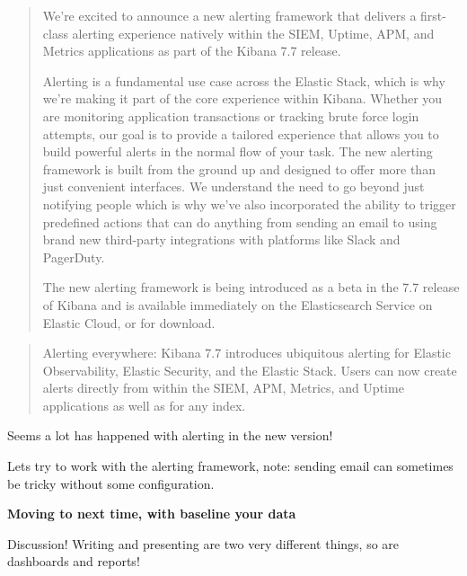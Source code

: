 \documentclass[Screen16to9,17pt]{foils}
\begin{document}
\begin{quote}\small
We’re excited to announce a new alerting framework that delivers a first-class alerting experience natively within the SIEM, Uptime, APM, and Metrics applications as part of the Kibana 7.7 release.

Alerting is a fundamental use case across the Elastic Stack, which is why we’re making it part of the core experience within Kibana. Whether you are monitoring application transactions or tracking brute force login attempts, our goal is to provide a tailored experience that allows you to build powerful alerts in the normal flow of your task. The new alerting framework is built from the ground up and designed to offer more than just convenient interfaces. We understand the need to go beyond just notifying people which is why we’ve also incorporated the ability to trigger predefined actions that can do anything from sending an email to using brand new third-party integrations with platforms like Slack and PagerDuty.

The new alerting framework is being introduced as a beta in the 7.7 release of Kibana and is available immediately on the Elasticsearch Service on Elastic Cloud, or for download.
\end{quote}

\begin{list2}
\item{}
\item {}
\item {}
\end{list2}




\begin{quote}
Alerting everywhere: Kibana 7.7 introduces ubiquitous alerting for Elastic Observability, Elastic Security, and the Elastic Stack. Users can now create alerts directly from within the SIEM, APM, Metrics, and Uptime applications as well as for any index.
\end{quote}

\begin{list2}
\item Seems a lot has happened with alerting in the new version!
\item Lets try to work with the alerting framework, note: sending email can sometimes be tricky without some configuration.
\end{list2}



\centerline{\bf\Large Moving to next time, with baseline your data}

Discussion! Writing and presenting are two very different things, so are dashboards and reports!

\slidenext{}
\end{document}
